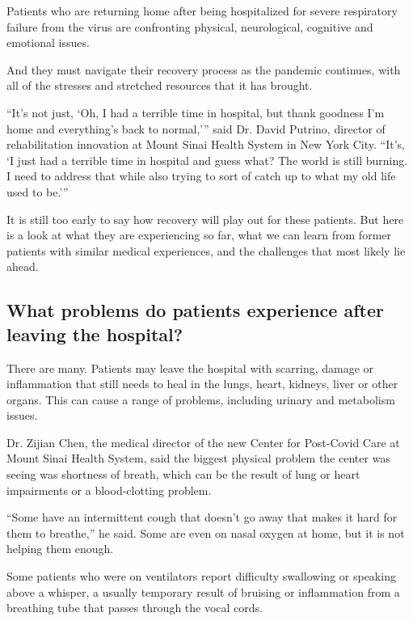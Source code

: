 Patients who are returning home after being hospitalized for severe
respiratory failure from the virus are confronting physical,
neurological, cognitive and emotional issues.

And they must navigate their recovery process as the pandemic continues,
with all of the stresses and stretched resources that it has brought.

``It's not just, `Oh, I had a terrible time in hospital, but thank
goodness I'm home and everything's back to normal,''' said Dr. David
Putrino, director of rehabilitation innovation at Mount Sinai Health
System in New York City. ``It's, `I just had a terrible time in hospital
and guess what? The world is still burning. I need to address that while
also trying to sort of catch up to what my old life used to be.'''

It is still too early to say how recovery will play out for these
patients. But here is a look at what they are experiencing so far, what
we can learn from former patients with similar medical experiences, and
the challenges that most likely lie ahead.

\hypertarget{what-problems-do-patients-experience-after-leaving-the-hospital}{%
\subsection{What problems do patients experience after leaving the
hospital?}\label{what-problems-do-patients-experience-after-leaving-the-hospital}}

There are many. Patients may leave the hospital with scarring, damage or
inflammation that still needs to heal in the lungs, heart, kidneys,
liver or other organs. This can cause a range of problems, including
urinary and metabolism issues.

Dr. Zijian Chen, the medical director of the new Center for Post-Covid
Care at Mount Sinai Health System, said the biggest physical problem the
center was seeing was shortness of breath, which can be the result of
lung or heart impairments or a blood-clotting problem.

``Some have an intermittent cough that doesn't go away that makes it
hard for them to breathe,'' he said. Some are even on nasal oxygen at
home, but it is not helping them enough.

Some patients who were on ventilators report difficulty swallowing or
speaking above a whisper, a usually temporary result of bruising or
inflammation from a breathing tube that passes through the vocal cords.

